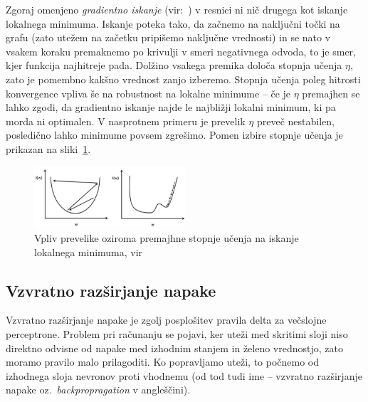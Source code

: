 \documentclass[mat1]{fmfdelo}
\begin{document}
Zgoraj omenjeno \emph{gradientno iskanje} (vir:~\cite{grad}) v resnici ni nič drugega kot iskanje lokalnega minimuma. Iskanje poteka tako, da začnemo na naključni točki na grafu (zato utežem na začetku pripišemo naključne vrednosti) in se nato v vsakem koraku premaknemo po krivulji v smeri negativnega odvoda, to je smer, kjer funkcija najhitreje pada. Dolžino vsakega premika določa stopnja učenja $\eta$, zato je pomembno kakšno vrednost zanjo izberemo. Stopnja učenja poleg hitrosti konvergence vpliva še na robustnost na lokalne
minimume -- če je $\eta$ premajhen se lahko zgodi, da gradientno iskanje najde le najbližji lokalni minimum, ki pa morda ni optimalen. V nasprotnem primeru je prevelik $\eta$ preveč nestabilen, posledično lahko minimume povsem zgrešimo. Pomen izbire stopnje učenja je prikazan na sliki~\ref{fig:gradi}.
%
\begin{figure}[!ht]
	\centering
	\includegraphics[width=0.5\textwidth]{gradient-descent.jpg}
	\caption{Vpliv prevelike oziroma premajhne stopnje učenja na iskanje lokalnega minimuma, vir~\cite{grad}}
		\label{fig:gradi}
\end{figure}

\subsection{Vzvratno razširjanje napake}
Vzvratno razširjanje napake je zgolj posplošitev pravila delta za večslojne perceptrone. Problem pri računanju se pojavi, ker uteži med skritimi sloji niso direktno odvisne od napake med izhodnim stanjem in želeno vrednostjo, zato moramo pravilo malo prilagoditi. Ko popravljamo uteži, to počnemo od izhodnega sloja nevronov proti vhodnemu (od tod tudi ime --  vzvratno razširjanje napake oz.\ \emph{backpropragation} v angleščini). 
\end{document}
